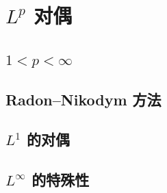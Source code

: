 \section{\texorpdfstring{\(L^p\)}{Lᵖ} 对偶}
\label{b1:sec:1003}


\subsection{\texorpdfstring{\(1<p<\infty\)}{1<p<∞}}
\label{b1:subsec:100301}

\subsection{Radon–Nikodym 方法}
\label{b1:subsec:100302}

\subsection{\texorpdfstring{\(L^1\)}{L1} 的对偶}
\label{b1:subsec:100303}

\subsection{\texorpdfstring{\(L^\infty\)}{L∞} 的特殊性}
\label{b1:subsec:100304}


